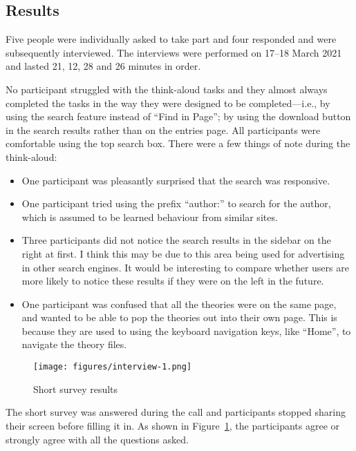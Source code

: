 \documentclass[bsc,frontabs,oneside,singlespacing,parskip,deptreport,logo]{infthesis}
\begin{document}
\subsection{Results} \label{redesign-eval-results}

Five people were individually asked to take part and four responded and were subsequently interviewed. The interviews were performed on 17--18 March 2021 and lasted 21, 12, 28 and 26 minutes in order.

No participant struggled with the think-aloud tasks and they almost always completed the tasks in the way they were designed to be completed---i.e., by using the search feature instead of ``Find in Page''; by using the download button in the search results rather than on the entries page. All participants were comfortable using the top search box. There were a few things of note during the think-aloud:

\begin{itemize}
    \item One participant was pleasantly surprised that the search was responsive.
    \item One participant tried using the prefix ``author:'' to search for the author, which is assumed to be learned behaviour from similar sites.
    \item Three participants did not notice the search results in the sidebar on the right at first. I think this may be due to this area being used for advertising in other search engines. It would be interesting to compare whether users are more likely to notice these results if they were on the left in the future. 
    \item One participant was confused that all the theories were on the same page, and wanted to be able to pop the theories out into their own page. This is because they are used to using the keyboard navigation keys, like ``Home'', to navigate the theory files.
\end{itemize}

\begin{figure}[h]
    \centering
    \texttt{[image: figures/interview-1.png]}
    \caption{Short survey results}
    \label{interview-results}
\end{figure}

The short survey was answered during the call and participants stopped sharing their screen before filling it in. As shown in Figure~\ref{interview-results}, the participants agree or strongly agree with all the questions asked. 
\end{document}
